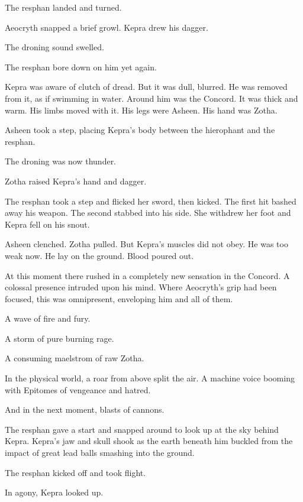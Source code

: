 \documentclass
  [a4paper,
   12pt,
   oneside
  ]%
  {article}
\begin{document}
The resphan landed and turned. 

Aeocryth snapped a brief growl.
Kepra drew his dagger. 

The droning sound swelled.

The resphan bore down on him yet again.

Kepra was aware of clutch of dread.
But it was dull, blurred. He was removed from it, as if swimming in water. 
Around him was the Concord. 
It was thick and warm. 
His limbs moved with it. 
His legs were Asheen. 
His hand was Zotha. 

Asheen took a step, placing Kepra's body between the hierophant and the resphan.

The droning was now thunder.

Zotha raised Kepra's hand and dagger. 

The resphan took a step and flicked her sword, then kicked. The first hit bashed away his weapon. The second stabbed into his side. 
She withdrew her foot and
Kepra fell on his snout. 

Asheen clenched. Zotha pulled. But Kepra's muscles did not obey.
He was too weak now.
He lay on the ground.
Blood poured out.

At this moment there rushed in a completely new sensation in the Concord. 
A colossal presence intruded upon his mind.
Where Aeocryth's grip had been focused, this was omnipresent, enveloping him and all of them.

A wave of fire and fury. 

A storm of pure burning rage.

A consuming maelstrom of raw Zotha.

In the physical world, a roar from above split the air. 
A machine voice booming with Epitomes of vengeance and hatred.

And in the next moment, blasts of cannons. 

The resphan gave a start and snapped around to look up at the sky behind Kepra. 
Kepra's jaw and skull shook as the earth beneath him buckled from the impact of great lead balls smashing into the ground. 

The resphan kicked off and took flight. 

In agony, Kepra looked up. 
\end{document}
